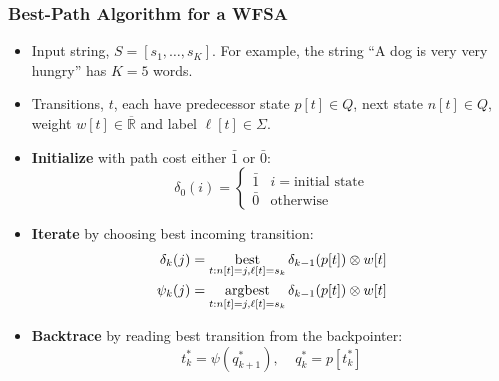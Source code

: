 \documentclass{beamer}
\newcommand{\best}{\operatornamewithlimits{best}}
\newcommand{\argbest}{\operatornamewithlimits{argbest}}
\begin{document}
\begin{frame}
  \frametitle{Best-Path Algorithm for a WFSA}

  \begin{itemize}
  \item Input string, $S=[s_1,\ldots,s_K]$.  For example, the
    string ``A dog is very very hungry'' has $K=5$ words.
  \item Transitions, $t$, each have predecessor state $p[t]\in Q$, next state
    $n[t]\in Q$, weight $w[t]\in\overline{\mathbb{R}}$ and label $\ell[t]\in\Sigma$.
  \end{itemize}
  \begin{itemize}
  \item {\bf Initialize} with path cost either $\bar{1}$ or $\bar{0}$:
    \begin{displaymath}
      \delta_0(i) = \begin{cases}
        \bar{1} & i=\mbox{initial state}\\
        \bar{0} & \mbox{otherwise}
      \end{cases}
    \end{displaymath}
  \item {\bf Iterate} by choosing best incoming transition:
    \begin{align*}
      \delta_k(j) &= \best_{t:n[t]=j,\ell[t]=s_k} \delta_{k-1}(p[t]) \otimes w[t]\\
      \psi_k(j) &= \argbest_{t:n[t]=j,\ell[t]=s_k} \delta_{k-1}(p[t]) \otimes w[t]
    \end{align*}
  \item {\bf Backtrace} by reading best transition from the backpointer:
    \begin{displaymath}
      t^*_k = \psi(q^*_{k+1}),~~~~~q^*_k=p[t^*_k]
    \end{displaymath}
  \end{itemize}
\end{frame}
\end{document}
